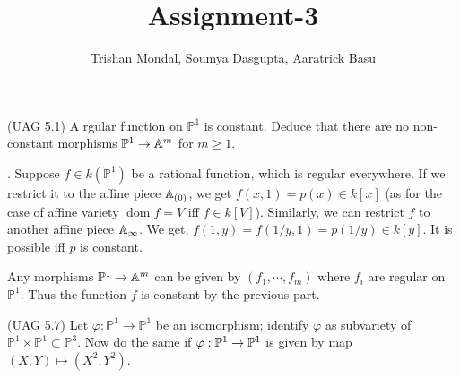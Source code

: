 \documentclass[12pt]{article}
\title{Assignment-3}
\author{Trishan Mondal, Soumya Dasgupta, Aaratrick Basu}
\date{}
\begin{document}
 \maketitle
 \setcounter{section}{3}

 \begin{prob} %
  (UAG 5.1) A rgular function on $\mathbb{P}^1$ is constant. Deduce that there are no non-constant morphisms $\mathbb{P}^1 \to \mathbb{A}^m$ for $m \geq 1$.
 \end{prob}

\sol. Suppose  $f \in k(\mathbb{P}^1)$ be a rational function, which is regular everywhere. If we restrict it to the affine piece $\mathbb{A}_{(0)}$, we get $f(x,1) = p(x) \in k[x]$ (as for the case of affine variety $\operatorname{dom} f = V$ iff $f \in k[V]$). Similarly, we can restrict $f$ to another affine piece $\mathbb{A}_{\infty}$. We get, $f(1,y) = f(1/y,1) = p(1/y) \in k[y]$. It is possible iff $p$ is constant.

\vspace*{0.2cm}

\noindent Any morphisms  $\mathbb{P}^1 \to \mathbb{A}^m$ can be given by $(f_1,\cdots,f_m)$ where $f_i$ are regular on $\mathbb{P}^1$. Thus the function $f$ is constant by the previous part. \Qed

\begin{prob} %
    (UAG 5.7) Let $\varphi : \mathbb{P}^1 \to \mathbb{P}^1$ be an isomorphism; identify $\varphi$ as subvariety of $\mathbb{P}^1 \times \mathbb{P}^1\subset \mathbb{P}^3$. Now do the same if $\varphi : \mathbb{P}^1 \to \mathbb{P}^1$ is given by map $(X,Y)\mapsto (X^2,Y^2)$.
\end{prob} 

\sol 
 
\end{document}
